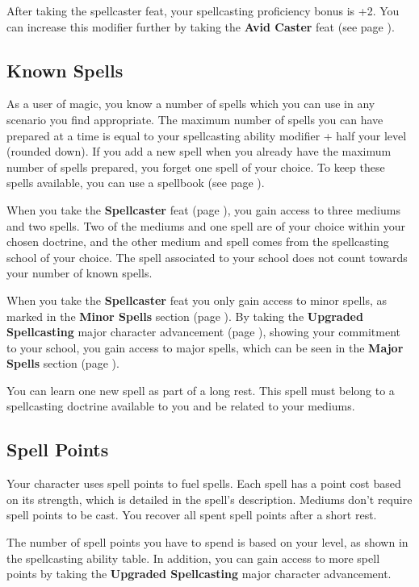     After taking the spellcaster feat, your spellcasting proficiency bonus is +2.
    You can increase this modifier further by taking the \textbf{Avid Caster} feat (see page \pageref{feat::avidcaster}).

\subsection*{Known Spells}
    As a user of magic, you know a number of spells which you can use in any scenario you find appropriate.
    The maximum number of spells you can have prepared at a time is equal to your spellcasting ability modifier + half your level (rounded down).
    If you add a new spell when you already have the maximum number of spells prepared, you forget one spell of your choice.
    To keep these spells available, you can use a spellbook (see page \pageref{item::spellbook}).

    When you take the \textbf{Spellcaster} feat (page \pageref{feat::spellcaster}), you gain access to three mediums and two spells.
    Two of the mediums and one spell are of your choice within your chosen doctrine, and the other medium and spell comes from the spellcasting school of your choice.
    The spell associated to your school does not count towards your number of known spells.

    When you take the \textbf{Spellcaster} feat you only gain access to minor spells, as marked in the \textbf{Minor Spells} section (page \pageref{sec::minorspells}).
    By taking the \textbf{Upgraded Spellcasting} major character advancement (page \pageref{mca::upgradedspellcasting}), showing your commitment to your school, you gain access to major spells, which can be seen in the \textbf{Major Spells} section (page \pageref{sec::majorspells}).

    You can learn one new spell as part of a long rest.
    This spell must belong to a spellcasting doctrine available to you and be related to your mediums.

\subsection*{Spell Points}
    Your character uses spell points to fuel spells.
    Each spell has a point cost based on its strength, which is detailed in the spell's description.
    Mediums don't require spell points to be cast.
    You recover all spent spell points after a short rest.

    The number of spell points you have to spend is based on your level, as shown in the spellcasting ability table.
    In addition, you can gain access to more spell points by taking the \textbf{Upgraded Spellcasting} major character advancement.

